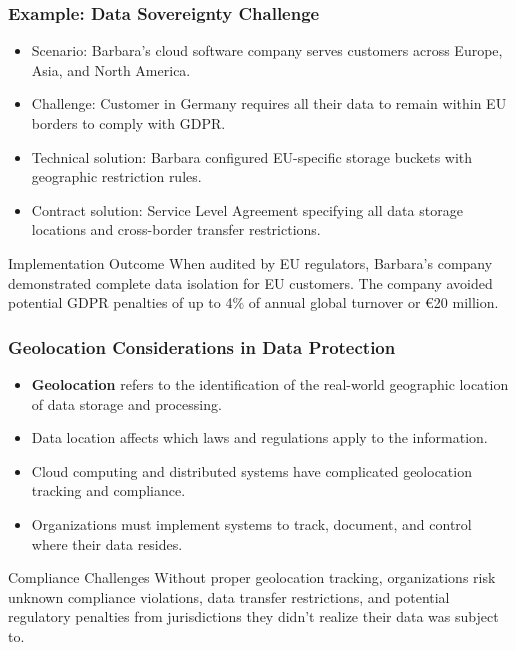 \documentclass{beamer}
\begin{document}
\begin{frame}
    \frametitle{Example: Data Sovereignty Challenge}
    \begin{itemize}
        \item Scenario: Barbara's cloud software company serves customers across Europe, Asia, and North America.
        \item Challenge: Customer in Germany requires all their data to remain within EU borders to comply with GDPR.
        \item Technical solution: Barbara configured EU-specific storage buckets with geographic restriction rules.
        \item Contract solution: Service Level Agreement specifying all data storage locations and cross-border transfer restrictions.
    \end{itemize}
    
    \begin{alertblock}{Implementation Outcome}
    When audited by EU regulators, Barbara's company demonstrated complete data isolation for EU customers. The company avoided potential GDPR penalties of up to 4\% of annual global turnover or €20 million.
    \end{alertblock}
    \end{frame}

\begin{frame}
\frametitle{Geolocation Considerations in Data Protection}
\begin{itemize}
\item \textbf{Geolocation} refers to the identification of the real-world geographic location of data storage and processing.
\item Data location affects which laws and regulations apply to the information.
\item Cloud computing and distributed systems have complicated geolocation tracking and compliance.
\item Organizations must implement systems to track, document, and control where their data resides.
\end{itemize}

\begin{alertblock}{Compliance Challenges}
Without proper geolocation tracking, organizations risk unknown compliance violations, data transfer restrictions, and potential regulatory penalties from jurisdictions they didn't realize their data was subject to.
\end{alertblock}
\end{frame}
\end{document}
